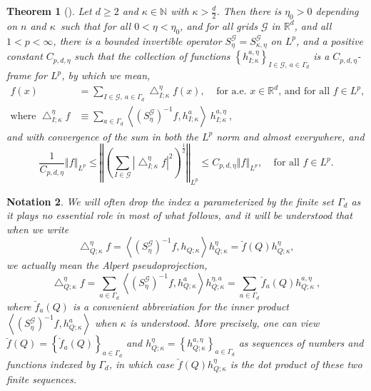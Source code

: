 \documentclass{amsart}%
\newtheorem{theorem}{Theorem}
\theoremstyle{plain}
\newtheorem{notation}[theorem]{Notation}
\numberwithin{equation}{section}
\begin{document}
\begin{theorem}
[\cite{Saw7}]\label{reproducing}Let $d\geq2$ and $\kappa\in\mathbb{N}$ with
$\kappa>\frac{d}{2}$. Then there is $\eta_{0}>0$ depending on $n$ and $\kappa
$\ such that for all $0<\eta<\eta_{0}$, and for all grids $\mathcal{G}$ in
$\mathbb{R}^{d}$, and all $1<p<\infty$, there is a bounded invertible operator
$S_{\eta}^{\mathcal{G}}=S_{\kappa,\eta}^{\mathcal{G}}$ on $L^{p}$, and a
positive constant $C_{p,d,\eta}$ such that the collection of functions
$\left\{  h_{I;\kappa}^{a,\eta}\right\}  _{I\in\mathcal{G},\ a\in\Gamma_{d}}$
is a $C_{p,d,\eta}$-frame for $L^{p}$, by which we mean,%
\begin{align}
f\left(  x\right)   &  =\sum_{I\in\mathcal{G},\ a\in\Gamma_{d}}\bigtriangleup
_{I;\kappa}^{\eta}f\left(  x\right)  ,\ \ \ \ \ \text{for a.e. }x\in
\mathbb{R}^{d}\text{, and for all }f\in L^{p},\label{bounded below}\\
\text{where }\bigtriangleup_{I;\kappa}^{\eta}f &  \equiv\sum_{a\in\Gamma_{d}%
}\left\langle \left(  S_{\eta}^{\mathcal{G}}\right)  ^{-1}f,h_{I;\kappa}%
^{a}\right\rangle \ h_{I;\kappa}^{a,\eta}\ ,\nonumber
\end{align}
and with convergence of the sum in both the $L^{p}$ norm and almost
everywhere, and%
\begin{equation}
\frac{1}{C_{p,d,\eta}}\left\Vert f\right\Vert _{L^{p}}\leq\left\Vert \left(
\sum_{I\in\mathcal{G}}\left\vert \bigtriangleup_{I;\kappa}^{\eta}f\right\vert
^{2}\right)  ^{\frac{1}{2}}\right\Vert _{L^{p}}\leq C_{p,d,\eta}\left\Vert
f\right\Vert _{L^{p}},\ \ \ \ \ \text{for all }f\in L^{p}.\label{square est}%
\end{equation}

\end{theorem}

\begin{notation}
\label{Notation Alpert} We will often drop the index $a$ parameterized by the
finite set $\Gamma_{d}$ as it plays no essential role in most of what follows,
and it will be understood that when we write
\[
\bigtriangleup_{Q;\kappa}^{\eta}f=\left\langle \left(  S_{\eta}^{\mathcal{G}%
}\right)  ^{-1}f,h_{Q;\kappa}\right\rangle h_{Q;\kappa}^{\eta}=\breve
{f}\left(  Q\right)  h_{Q;\kappa}^{\eta},
\]
we \emph{actually} mean the Alpert \emph{pseudoprojection},%
\[
\bigtriangleup_{Q;\kappa}^{\eta}f=\sum_{a\in\Gamma_{d}}\left\langle \left(
S_{\eta}^{\mathcal{G}}\right)  ^{-1}f,h_{Q;\kappa}^{a}\right\rangle
h_{Q;\kappa}^{\eta,a}=\sum_{a\in\Gamma_{d}}\breve{f}_{a}\left(  Q\right)
h_{Q;\kappa}^{a,\eta}\ ,
\]
where $\breve{f}_{a}\left(  Q\right)  $ is a convenient abbreviation for the
inner product $\left\langle \left(  S_{\eta}^{\mathcal{G}}\right)
^{-1}f,h_{Q;\kappa}^{a}\right\rangle $ when $\kappa$ is understood. More
precisely, one can view $\breve{f}\left(  Q\right)  =\left\{  \breve{f}%
_{a}\left(  Q\right)  \right\}  _{a\in\Gamma_{d}}$ and $h_{Q;\kappa}^{\eta
}=\left\{  h_{Q;\kappa}^{a,\eta}\right\}  _{a\in\Gamma_{d}}$ as sequences of
numbers and functions indexed by $\Gamma_{d}$, in which case $\breve{f}\left(
Q\right)  h_{Q;\kappa}^{\eta}$ is the dot product of these two finite sequences.
\end{notation}
\end{document}
